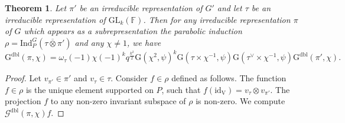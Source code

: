 \documentclass[12pt, reqno]{amsart}
\newtheorem{theorem}{Theorem}[section]
\theoremstyle{definition}
\theoremstyle{definition}
\theoremstyle{definition}
\newcommand{\idmap}{\mathrm{id}}
\newcommand{\hermitianSpace}{\mathrm{V}}
\newcommand{\fieldCharacter}{\psi}
\newcommand{\centralCharacter}[1]{\omega_{#1}}
\newcommand{\Ind}[3]{\mathrm{Ind}_{#1}^{#2}\left(#3\right)}
\newcommand{\Contragradient}[1]{#1^{\vee}}
\newcommand{\GL}{\mathrm{GL}}
\newcommand{\finiteField}{\mathbb{F}}
\newcommand{\dblGaussSum}[2]{\mathcal{G}^{\mathrm{dbl}}\left(#1, #2\right)}
\newcommand{\GaussSumScalar}[2]{\mathrm{G}\left(#1, #2\right)}
\newcommand{\dblGaussSumScalar}[2]{\mathrm{G}^{\mathrm{dbl}}\left(#1, #2\right)}
\begin{document}
\begin{theorem}
	Let $\pi'$ be an irreducible representation of $G'$ and let $\tau$ be an irreducible representation of $\GL_k\left(\finiteField\right)$. Then for any irreducible representation $\pi$ of $G$ which appears as a subrepresentation the parabolic induction $\rho = \Ind{P}{G}{\tau \overline{\otimes} \pi'}$ and any $\chi \ne 1$, we have
	$$\dblGaussSumScalar{\pi}{\chi} = \centralCharacter{\tau}\left(-1\right) \chi\left(-1\right)^k q^{\frac{k^2}{2}} \GaussSumScalar{\chi^2}{\fieldCharacter}^k \GaussSumScalar{\tau \times \chi^{-1}}{\fieldCharacter} \GaussSumScalar{\Contragradient{\tau} \times \chi^{-1}}{\fieldCharacter} \dblGaussSumScalar{\pi'}{\chi}.$$
\end{theorem}
\begin{proof}
	Let $v_{\pi'} \in \pi'$ and $v_{\tau} \in \tau$. Consider $f \in \rho$ defined as follows. The function $f \in \rho$ is the unique element supported on $P$, such that $f\left(\idmap_{\hermitianSpace}\right) = v_{\tau} \otimes v_{\pi'}$. The projection $f$ to any non-zero invariant subspace of $\rho$ is non-zero. We compute $\dblGaussSum{\pi}{\chi} f$.
	

\end{proof}
\end{document}
